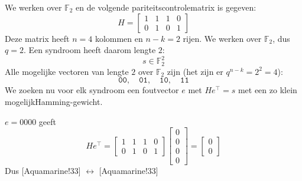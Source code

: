 \textbf{} We werken over $\mathbb{F}_2$ en de volgende pariteitscontrolematrix is gegeven:
\begin{equation*}
    H = \begin{bmatrix}
        1 & 1 & 1 & 0 \\
        0 & 1 & 0 & 1
    \end{bmatrix}
\end{equation*}
Deze matrix heeft $n=4$ kolommen en $n-k=2$ rijen. We werken over $\mathbb{F}_2$, dus $q=2$. Een syndroom heeft daarom lengte $2$:
\begin{equation*}
    s \in \mathbb{F}_2^2
\end{equation*}
Alle mogelijke vectoren van lengte $2$ over $\mathbb{F}_2$ zijn (het zijn er $q^{n-k}=2^{2}=4$):
\begin{equation*}
    \mathtt{00}, \quad \mathtt{01}, \quad \mathtt{10}, \quad \mathtt{11}
\end{equation*}
We zoeken nu voor elk syndroom een foutvector $e$ met $He^\top = s$ met een zo klein mogelijkHamming-gewicht.

\newline
$e=0000$ geeft
\begin{equation*}
    He^\top = \begin{bmatrix}
        1 & 1 & 1 & 0 \\
        0 & 1 & 0 & 1
    \end{bmatrix} \begin{bmatrix}
        0 \\ 0 \\ 0 \\ 0
    \end{bmatrix} = \begin{bmatrix}
        0 \\ 0
    \end{bmatrix}
\end{equation*}
Dus [Aquamarine!33] $\longleftrightarrow$ [Aquamarine!33]

